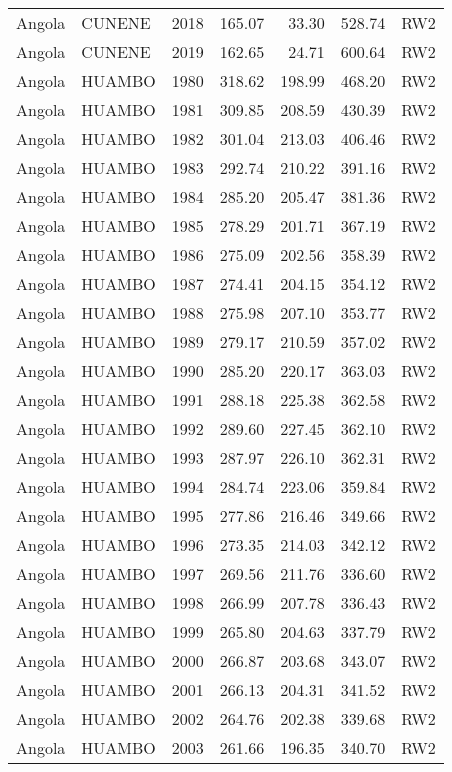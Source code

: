 \begin{longtable}{lllrrrl}
  Angola & CUNENE & 2018 & 165.07 & 33.30 & 528.74 & RW2 \\ 
  Angola & CUNENE & 2019 & 162.65 & 24.71 & 600.64 & RW2 \\ 
  Angola & HUAMBO & 1980 & 318.62 & 198.99 & 468.20 & RW2 \\ 
  Angola & HUAMBO & 1981 & 309.85 & 208.59 & 430.39 & RW2 \\ 
  Angola & HUAMBO & 1982 & 301.04 & 213.03 & 406.46 & RW2 \\ 
  Angola & HUAMBO & 1983 & 292.74 & 210.22 & 391.16 & RW2 \\ 
  Angola & HUAMBO & 1984 & 285.20 & 205.47 & 381.36 & RW2 \\ 
  Angola & HUAMBO & 1985 & 278.29 & 201.71 & 367.19 & RW2 \\ 
  Angola & HUAMBO & 1986 & 275.09 & 202.56 & 358.39 & RW2 \\ 
  Angola & HUAMBO & 1987 & 274.41 & 204.15 & 354.12 & RW2 \\ 
  Angola & HUAMBO & 1988 & 275.98 & 207.10 & 353.77 & RW2 \\ 
  Angola & HUAMBO & 1989 & 279.17 & 210.59 & 357.02 & RW2 \\ 
  Angola & HUAMBO & 1990 & 285.20 & 220.17 & 363.03 & RW2 \\ 
  Angola & HUAMBO & 1991 & 288.18 & 225.38 & 362.58 & RW2 \\ 
  Angola & HUAMBO & 1992 & 289.60 & 227.45 & 362.10 & RW2 \\ 
  Angola & HUAMBO & 1993 & 287.97 & 226.10 & 362.31 & RW2 \\ 
  Angola & HUAMBO & 1994 & 284.74 & 223.06 & 359.84 & RW2 \\ 
  Angola & HUAMBO & 1995 & 277.86 & 216.46 & 349.66 & RW2 \\ 
  Angola & HUAMBO & 1996 & 273.35 & 214.03 & 342.12 & RW2 \\ 
  Angola & HUAMBO & 1997 & 269.56 & 211.76 & 336.60 & RW2 \\ 
  Angola & HUAMBO & 1998 & 266.99 & 207.78 & 336.43 & RW2 \\ 
  Angola & HUAMBO & 1999 & 265.80 & 204.63 & 337.79 & RW2 \\ 
  Angola & HUAMBO & 2000 & 266.87 & 203.68 & 343.07 & RW2 \\ 
  Angola & HUAMBO & 2001 & 266.13 & 204.31 & 341.52 & RW2 \\ 
  Angola & HUAMBO & 2002 & 264.76 & 202.38 & 339.68 & RW2 \\ 
  Angola & HUAMBO & 2003 & 261.66 & 196.35 & 340.70 & RW2 \\ 

\end{longtable}
